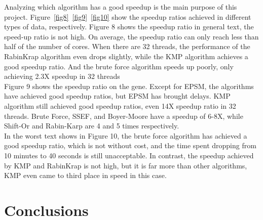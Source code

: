 \documentclass[11pt]{article}       %
\newcommand{\includeFig}[3]      {\begin{figure}[htb] \begin{center}
                                 \includegraphics
                                 [width=4in,keepaspectratio] %
                                 {#2}\caption{\label{#1}#3} \end{center} \end{figure}}
\begin{document}
Analyzing which algorithm has a good speedup is the main purpose of this project. Figure~\ref{fig8}~\ref{fig9}~\ref{fig10} show the speedup ratios achieved in different types of data, respectively. Figure 8 shows the speedup ratio in general text, the speed-up ratio is not high. On average, the speedup ratio can only reach less than half of the number of cores. When there are 32 threads, the performance of the RabinKrap algorithm even drops slightly, while the KMP algorithm achieves a good speedup ratio. And the brute force algorithm speeds up poorly, only achieving 2.3X speedup in 32 threads\\ 
Figure 9 shows the speedup ratio on the gene. Except for EPSM, the algorithms have achieved good speedup ratios, but EPSM has brought delays. KMP algorithm still achieved good speedup ratios, even 14X speedup ratio in 32 threads. Brute Force, SSEF, and Boyer-Moore have a speedup of 6-8X, while Shift-Or and Rabin-Karp are 4 and 5 times respectively.\\
In the worst text shows in Figure 10, the brute force algorithm has achieved a good speedup ratio, which is not without cost, and the time spent dropping from 10 minutes to 40 seconds is still unacceptable. In contrast, the speedup achieved by KMP and RabinKrap is not high, but it is far more than other algorithms, KMP even came to third place in speed in this case.






\section{Conclusions} \label{concl}
\end{document}
